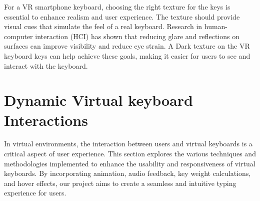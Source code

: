 For a \ac{VR} smartphone keyboard, choosing the right texture for the keys is essential to enhance realism and user experience. The texture should provide visual cues that simulate the feel of a real keyboard. Research in human-computer interaction (HCI) \cite{Fitts2004} has shown that reducing glare and reflections on surfaces can improve visibility and reduce eye strain. A Dark texture on the \ac{VR} keyboard keys can help achieve these goals, making it easier for users to see and interact with the keyboard.

\section{Dynamic Virtual keyboard Interactions}
In virtual environments, the interaction between users and virtual keyboards is a critical aspect of user experience. This section explores the various techniques and methodologies implemented to enhance the usability and responsiveness of virtual keyboards. By incorporating animation, audio feedback, key weight calculations, and hover effects, our project aims to create a seamless and intuitive typing experience for users.
